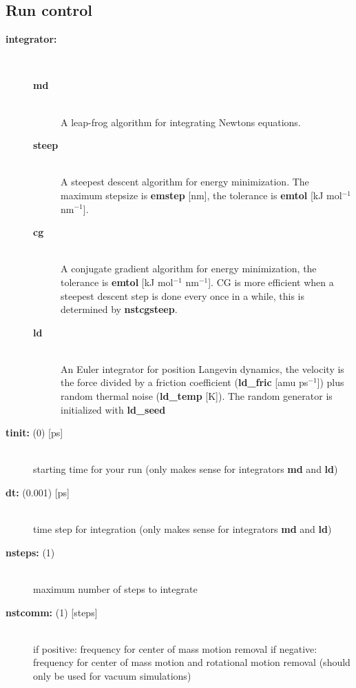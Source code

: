 \subsection{ Run control}
\begin{description}
\item[{\bf integrator:}]\mbox{}\\
\vspace{-2ex}\begin{description}
\item[{\bf md} ]\mbox{}\\
A leap-frog algorithm for integrating Newtons equations.
\item[{\bf steep}]\mbox{}\\
A steepest descent algorithm for energy minimization.
The maximum stepsize is {\bf emstep} [nm], the tolerance is 
{\bf emtol} [kJ mol$^{-1}$ nm$^{-1}$].
\item[{\bf cg}]\mbox{}\\
 A conjugate gradient algorithm for energy minimization,
the tolerance is {\bf emtol} [kJ mol$^{-1}$ nm$^{-1}$]. 
CG is more efficient
when a steepest descent step is done every once in a while,
this is determined by {\bf nstcgsteep}.
\item[{\bf ld}]\mbox{}\\
 An Euler integrator for position Langevin dynamics, the
velocity is the force divided by a friction coefficient 
({\bf ld\_fric} [amu ps$^{-1}$])
plus random thermal noise ({\bf ld\_temp} [K]). 
The random generator is initialized with {\bf ld\_seed}
\end{description}
\item[{\bf tinit: }(0) {[ps]}]\mbox{}\\
starting time for your run (only makes sense for integrators {\bf md} 
and {\bf ld})
\item[{\bf dt: }(0.001) {[ps]}]\mbox{}\\
time step for integration (only makes sense for integrators {\bf md} 
and {\bf ld})
\item[{\bf nsteps: }(1)]\mbox{}\\
maximum number of steps to integrate
\item[{\bf nstcomm: }(1) {[steps]}]\mbox{}\\
if positive: frequency for center of mass motion removal
if negative: frequency for center of mass motion and rotational 
motion removal (should only be used for vacuum simulations)
\end{description}

